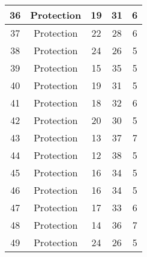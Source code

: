 \documentclass[results.tex]{subfiles}
\begin{document}
\begin{center}
\begin{tabular}{| c || c | c | c | c |}
            \hline
            36                      & Protection                   & 19                     & 31                      & 6                    \\
            \hline
            37                      & Protection                   & 22                     & 28                      & 6                    \\
            \hline
            38                      & Protection                   & 24                     & 26                      & 5                    \\
            \hline
            39                      & Protection                   & 15                     & 35                      & 5                    \\
            \hline
            40                      & Protection                   & 19                     & 31                      & 5                    \\
            \hline
            41                      & Protection                   & 18                     & 32                      & 6                    \\
            \hline
            42                      & Protection                   & 20                     & 30                      & 5                    \\
            \hline
            43                      & Protection                   & 13                     & 37                      & 7                    \\
            \hline
            44                      & Protection                   & 12                     & 38                      & 5                    \\
            \hline
            45                      & Protection                   & 16                     & 34                      & 5                    \\
            \hline
            46                      & Protection                   & 16                     & 34                      & 5                    \\
            \hline
            47                      & Protection                   & 17                     & 33                      & 6                    \\
            \hline
            48                      & Protection                   & 14                     & 36                      & 7                    \\
            \hline
            49                      & Protection                   & 24                     & 26                      & 5                    \\
            \hline
        \end{tabular}
    \end{center}
\end{document}
